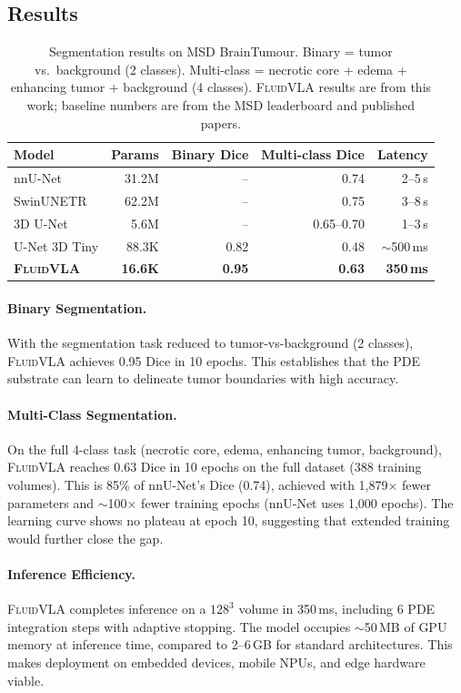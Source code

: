 \documentclass{article}
\newcommand{\fluidvla}{\textsc{FluidVLA}}
\begin{document}
\subsection{Results}

\begin{table}[t]
\centering
\caption{Segmentation results on MSD BrainTumour. Binary = tumor vs.\ background (2 classes). Multi-class = necrotic core + edema + enhancing tumor + background (4 classes). \fluidvla{} results are from this work; baseline numbers are from the MSD leaderboard and published papers.}
\label{tab:results}
\begin{tabular}{lrrrr}
\toprule
\textbf{Model} & \textbf{Params} & \textbf{Binary Dice} & \textbf{Multi-class Dice} & \textbf{Latency} \\
\midrule
nnU-Net & 31.2M & -- & 0.74 & 2--5\,s \\
SwinUNETR & 62.2M & -- & 0.75 & 3--8\,s \\
3D U-Net & 5.6M & -- & 0.65--0.70 & 1--3\,s \\
U-Net 3D Tiny & 88.3K & 0.82 & 0.48 & $\sim$500\,ms \\
\midrule
\textbf{\fluidvla{}} & \textbf{16.6K} & \textbf{0.95} & \textbf{0.63} & \textbf{350\,ms} \\
\bottomrule
\end{tabular}
\end{table}

\paragraph{Binary Segmentation.}
With the segmentation task reduced to tumor-vs-background (2 classes), \fluidvla{} achieves 0.95 Dice in 10 epochs. This establishes that the PDE substrate can learn to delineate tumor boundaries with high accuracy.

\paragraph{Multi-Class Segmentation.}
On the full 4-class task (necrotic core, edema, enhancing tumor, background), \fluidvla{} reaches 0.63 Dice in 10 epochs on the full dataset (388 training volumes). This is 85\% of nnU-Net's Dice (0.74), achieved with 1,879$\times$ fewer parameters and $\sim$100$\times$ fewer training epochs (nnU-Net uses 1,000 epochs). The learning curve shows no plateau at epoch 10, suggesting that extended training would further close the gap.

\paragraph{Inference Efficiency.}
\fluidvla{} completes inference on a $128^3$ volume in 350\,ms, including 6 PDE integration steps with adaptive stopping. The model occupies $\sim$50\,MB of GPU memory at inference time, compared to 2--6\,GB for standard architectures. This makes deployment on embedded devices, mobile NPUs, and edge hardware viable.
\end{document}
